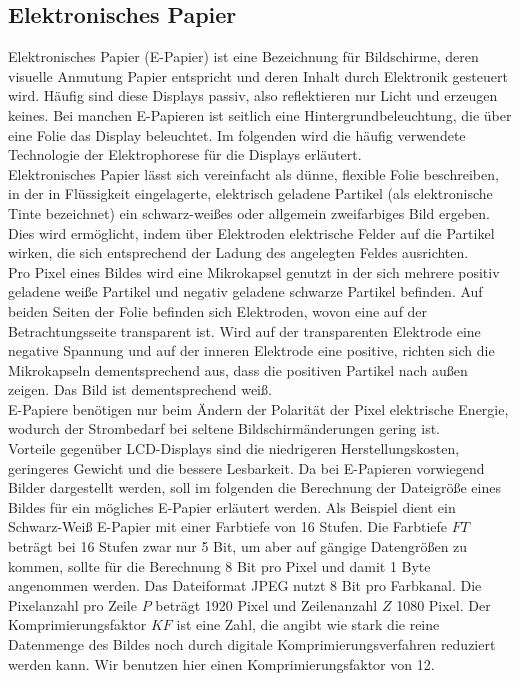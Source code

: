 \subsection{Elektronisches Papier}
Elektronisches Papier (E-Papier) ist eine Bezeichnung für Bildschirme, deren visuelle Anmutung Papier entspricht und deren Inhalt durch Elektronik gesteuert wird. Häufig sind diese Displays passiv, also reflektieren nur Licht und erzeugen keines. Bei manchen E-Papieren ist seitlich eine Hintergrundbeleuchtung, die über eine Folie das Display beleuchtet. Im folgenden wird die häufig verwendete Technologie der Elektrophorese für die Displays erläutert. \\
\glqq Elektronisches Papier lässt sich vereinfacht als dünne, flexible Folie beschreiben, in der in Flüssigkeit eingelagerte, elektrisch geladene Partikel (als elektronische Tinte bezeichnet) ein schwarz-weißes oder allgemein zweifarbiges Bild ergeben. Dies wird ermöglicht, indem über Elektroden elektrische Felder auf die Partikel wirken, die sich entsprechend der Ladung des angelegten Feldes ausrichten. \grqq \cite[Seite 568]{Schryen.2002} \\
Pro Pixel eines Bildes wird eine Mikrokapsel genutzt in der sich mehrere positiv geladene weiße Partikel und negativ geladene schwarze Partikel befinden. Auf beiden Seiten der Folie befinden sich Elektroden, wovon eine auf der Betrachtungsseite transparent ist. Wird auf der transparenten Elektrode eine negative Spannung und auf der inneren Elektrode eine positive, richten sich die Mikrokapseln dementsprechend aus, dass die positiven Partikel nach außen zeigen. Das Bild ist dementsprechend weiß. \cite[Vgl. Seite 567 f.]{Schryen.2002} \\
E-Papiere benötigen nur beim Ändern der Polarität der Pixel elektrische Energie, wodurch der Strombedarf bei seltene Bildschirmänderungen gering ist. \\
Vorteile gegenüber LCD-Displays sind die niedrigeren Herstellungskosten, geringeres Gewicht und die bessere Lesbarkeit. \cite[Vgl. Seite 569]{Schryen.2002}
Da bei E-Papieren vorwiegend Bilder dargestellt werden, soll im folgenden die Berechnung der Dateigröße eines Bildes für ein mögliches E-Papier erläutert werden.
Als Beispiel dient ein Schwarz-Weiß E-Papier mit einer Farbtiefe von 16 Stufen. Die Farbtiefe $ FT $ beträgt bei 16 Stufen zwar nur 5 Bit, um aber auf gängige Datengrößen zu kommen, sollte für die Berechnung 8 Bit pro Pixel und damit 1 Byte angenommen werden. Das Dateiformat JPEG  nutzt 8 Bit pro Farbkanal. Die Pixelanzahl pro Zeile $ P $ beträgt 1920 Pixel und Zeilenanzahl $ Z $ 1080 Pixel. Der Komprimierungsfaktor $ KF $ ist eine Zahl, die angibt wie stark die reine Datenmenge des Bildes noch durch digitale Komprimierungsverfahren reduziert werden kann. Wir benutzen hier einen Komprimierungsfaktor von 12. \cite[Vgl. Seite 22]{Buhler.2018}
